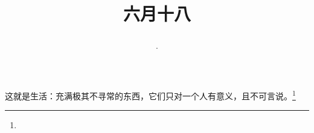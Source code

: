 \title{\date[d=23,m=7,y=2024][year:cn-y,年,month:cn,day:cn,日,·,weekday]·六月十八 }
这就是生活：充满极其不寻常的东西，它们只对一个人有意义，且不可言说。\footnote{ }

